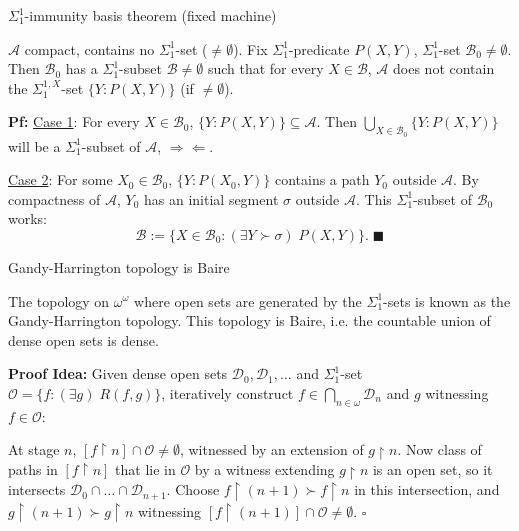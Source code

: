 \begin{frame}{$\Sigma_1^{1}$-immunity basis theorem (fixed machine)}
  \begin{lemma}
    $\mathcal{A}$ compact, contains no $\Sigma_1^{1}$-set
    ($\neq\emptyset$). Fix $\Sigma_1^{1}$-predicate $P(X,Y)$,
    $\Sigma_1^{1}$-set $\mathcal{B}_0\neq\emptyset$. Then
    $\mathcal{B}_0$ has a $\Sigma_1^{1}$-subset
    $\mathcal{B}\neq\emptyset$ such that for every $X\in\mathcal{B}$,
    $\mathcal{A}$ does not contain the $\Sigma_1^{1,X}$-set
    $\{Y:P(X,Y)\}$ (if $\neq\emptyset$).
  \end{lemma}

  \vspace{1em}
  \textbf{Pf:} \underline{Case 1}: For every $X\in\mathcal{B}_0$,
  $\{Y:P(X,Y)\}\subseteq\mathcal{A}$. Then $\bigcup_{X\in\mathcal{B}_0}
  \{Y:P(X,Y)\}$ will be a $\Sigma_1^{1}$-subset of $\mathcal{A}$,
  $\Rightarrow\Leftarrow$.

  \vspace{1em}
  \underline{Case 2}: For some $X_0\in\mathcal{B}_0$, $\{Y:P(X_0,Y)\}$
  contains a path $Y_0$ outside $\mathcal{A}$. By compactness of
  $\mathcal{A}$, $Y_0$ has an initial segment $\sigma$ outside
  $\mathcal{A}$. This $\Sigma_1^{1}$-subset of $\mathcal{B}_0$ works:
  \[\mathcal{B}:= \{X\in\mathcal{B}_0: (\exists Y\succ\sigma)\; P(X,Y)\}.\;
  \blacksquare\]
\end{frame}

\begin{frame}{Gandy-Harrington topology is Baire}
  \begin{fact}
    \label{fact:gandy-harrington}
    The topology on $\omega^\omega$ where open sets are generated by the
    $\Sigma_1^{1}$-sets is known as the Gandy-Harrington topology.  This
    topology is Baire, i.e. the countable union of dense open sets is
    dense.
  \end{fact}

  \vspace{1em}
  \textbf{Proof Idea:} Given dense open sets
  $\mathcal{D}_0,\mathcal{D}_1,\ldots$ and
  $\Sigma_1^1$-set $\mathcal{O}=\{f:(\exists g)\; R(f,g)\}$, iteratively
  construct $f\in\bigcap_{n\in\omega}\mathcal{D}_n$ and $g$ witnessing
  $f\in\mathcal{O}$:
  
  \vspace{1em}
  At stage $n$, $[f\restriction n]\cap\mathcal{O} \neq\emptyset$, witnessed
  by an extension of $g\restriction n$. Now class of paths in
  $[f\restriction n]$ that lie in $\mathcal{O}$ by a witness extending
  $g\restriction n$ is an open set, so it intersects
  $\mathcal{D}_0\cap\ldots\cap\mathcal{D}_{n+1}$. Choose $f\restriction
  (n+1) \succ f\restriction n$ in this intersection, and
  $g\restriction (n+1) \succ g\restriction n$ witnessing $[f\restriction
  (n+1)]\cap\mathcal{O} \neq\emptyset$. $\square$
\end{frame}

